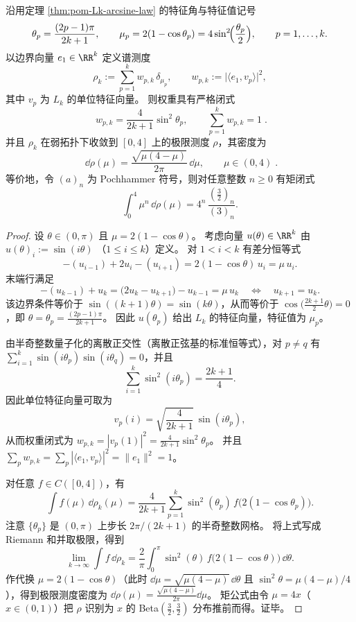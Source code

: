 
\begin{theorem}\label{thm:pom-Lk-boundary-spectral-measure-beta32}
沿用定理 \ref{thm:pom-Lk-arcsine-law} 的特征角与特征值记号
\[
\theta_p=\frac{(2p-1)\pi}{2k+1},
\qquad
\mu_p=2(1-\cos\theta_p)=4\sin^2\!\Bigl(\frac{\theta_p}{2}\Bigr),
\qquad p=1,\dots,k.
\]
以边界向量 \(e_1\in\RR^k\) 定义谱测度
\[
\rho_k:=\sum_{p=1}^{k} w_{p,k}\,\delta_{\mu_p},
\qquad
w_{p,k}:=\bigl|\langle e_1,v_p\rangle\bigr|^2,
\]
其中 \(v_p\) 为 \(L_k\) 的单位特征向量。
则权重具有严格闭式
\[
\boxed{\;
w_{p,k}=\frac{4}{2k+1}\sin^2\theta_p,
\qquad \sum_{p=1}^{k} w_{p,k}=1\; }.
\]
并且 \(\rho_k\) 在弱拓扑下收敛到 \([0,4]\) 上的极限测度 \(\rho\)，其密度为
\[
\boxed{\;
\dd\rho(\mu)=\frac{\sqrt{\mu(4-\mu)}}{2\pi}\,\dd\mu,\qquad \mu\in(0,4)\; }.
\]
等价地，令 \((a)_n\) 为 Pochhammer 符号，则对任意整数 \(n\ge 0\) 有矩闭式
\[
\int_{0}^{4}\mu^{n}\,\dd\rho(\mu)=4^{n}\,\frac{(\tfrac32)_n}{(3)_n}.
\]
\end{theorem}

\begin{proof}
设 \(\theta\in(0,\pi)\) 且 \(\mu=2(1-\cos\theta)\)。
考虑向量 \(u(\theta)\in\RR^k\) 由
\(
u(\theta)_i:=\sin(i\theta)
\)
（\(1\le i\le k\)）定义。
对 \(1<i<k\) 有差分恒等式
\[
-(u_{i-1})+2u_i-(u_{i+1})
=2(1-\cos\theta)\,u_i=\mu\,u_i.
\]
末端行满足
\[
-(u_{k-1})+u_k
=\bigl(2u_k-u_{k+1}\bigr)-u_{k-1}
=\mu\,u_k\quad\Longleftrightarrow\quad u_{k+1}=u_k.
\]
该边界条件等价于 \(\sin((k+1)\theta)=\sin(k\theta)\)，从而等价于 \(\cos\!\bigl(\tfrac{2k+1}{2}\theta\bigr)=0\)，即
\(\theta=\theta_p=\frac{(2p-1)\pi}{2k+1}\)。
因此 \(u(\theta_p)\) 给出 \(L_k\) 的特征向量，特征值为 \(\mu_p\)。
\par
由半奇整数量子化的离散正交性（离散正弦基的标准恒等式），对 \(p\neq q\) 有
\(
\sum_{i=1}^{k}\sin(i\theta_p)\sin(i\theta_q)=0
\)，并且
\[
\sum_{i=1}^{k}\sin^2(i\theta_p)=\frac{2k+1}{4}.
\]
因此单位特征向量可取为
\[
v_p(i)=\sqrt{\frac{4}{2k+1}}\,\sin(i\theta_p),
\]
从而权重闭式为
\(
w_{p,k}=|v_p(1)|^2=\frac{4}{2k+1}\sin^2\theta_p
\)。
并且 \(\sum_{p}w_{p,k}=\sum_{p}|\langle e_1,v_p\rangle|^2=\|e_1\|^2=1\)。
\par
对任意 \(f\in C([0,4])\)，有
\[
\int f(\mu)\,\dd\rho_k(\mu)
=\frac{4}{2k+1}\sum_{p=1}^{k}\sin^2(\theta_p)\,f\!\bigl(2(1-\cos\theta_p)\bigr).
\]
注意 \(\{\theta_p\}\) 是 \((0,\pi)\) 上步长 \(2\pi/(2k+1)\) 的半奇整数网格。
将上式写成 Riemann 和并取极限，得到
\[
\lim_{k\to\infty}\int f\,\dd\rho_k
=\frac{2}{\pi}\int_0^\pi \sin^2(\theta)\,f\!\bigl(2(1-\cos\theta)\bigr)\,\dd\theta.
\]
作代换 \(\mu=2(1-\cos\theta)\)（此时 \(\dd\mu=\sqrt{\mu(4-\mu)}\,\dd\theta\) 且 \(\sin^2\theta=\mu(4-\mu)/4\)），得到极限测度密度为
\(
\dd\rho(\mu)=\frac{\sqrt{\mu(4-\mu)}}{2\pi}\dd\mu
\)。
矩公式由令 \(\mu=4x\)（\(x\in(0,1)\)）把 \(\rho\) 识别为 \(x\) 的 Beta\((\tfrac32,\tfrac32)\) 分布推前而得。证毕。
\end{proof}

